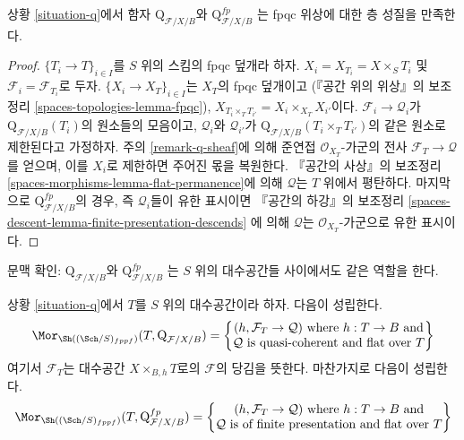 \begin{lemma}
\label{lemma-q-sheaf}
상황 \ref{situation-q}에서 함자
$\text{Q}_{\mathcal{F}/X/B}$와
$\text{Q}^{fp}_{\mathcal{F}/X/B}$
는 fpqc 위상에 대한 층 성질을 만족한다.
\end{lemma}

\begin{proof}
$\{T_i \to T\}_{i \in I}$를 $S$ 위의 스킴의 fpqc 덮개라 하자.
$X_i = X_{T_i} = X \times_S T_i$ 및 $\mathcal{F}_i = \mathcal{F}_{T_i}$로 두자.
$\{X_i \to X_T\}_{i \in I}$는 $X_T$의 fpqc 덮개이고
(『공간 위의 위상』의 보조정리 \ref{spaces-topologies-lemma-fpqc}),
$X_{T_i \times_T T_{i'}} = X_i \times_{X_T} X_{i'}$이다.
$\mathcal{F}_i \to \mathcal{Q}_i$가 $\text{Q}_{\mathcal{F}/X/B}(T_i)$의
원소들의 모음이고, $\mathcal{Q}_i$와 $\mathcal{Q}_{i'}$가
$\text{Q}_{\mathcal{F}/X/B}(T_i \times_T T_{i'})$의 같은 원소로
제한된다고 가정하자. 주의 \ref{remark-q-sheaf}에 의해 준연접
$\mathcal{O}_{X_T}$-가군의 전사 $\mathcal{F}_T \to \mathcal{Q}$를 얻으며,
이를 $X_i$로 제한하면 주어진 몫을 복원한다.
『공간의 사상』의 보조정리 \ref{spaces-morphisms-lemma-flat-permanence}에 의해
$\mathcal{Q}$는 $T$ 위에서 평탄하다. 마지막으로
$\text{Q}^{fp}_{\mathcal{F}/X/B}$의 경우, 즉 $\mathcal{Q}_i$들이
유한 표시이면 『공간의 하강』의 보조정리
\ref{spaces-descent-lemma-finite-presentation-descends}
에 의해 $\mathcal{Q}$는 $\mathcal{O}_{X_T}$-가군으로 유한 표시이다.
\end{proof}

\noindent
문맥 확인: $\text{Q}_{\mathcal{F}/X/B}$와
$\text{Q}^{fp}_{\mathcal{F}/X/B}$
는 $S$ 위의 대수공간들 사이에서도 같은 역할을 한다.

\begin{lemma}
\label{lemma-extend-q-to-spaces}
상황 \ref{situation-q}에서 $T$를 $S$ 위의 대수공간이라 하자. 다음이 성립한다.
$$
\Mor_{\Sh((\Sch/S)_{fppf})}(T,  \text{Q}_{\mathcal{F}/X/B}) =
\left\{
\begin{matrix}
(h, \mathcal{F}_T \to \mathcal{Q}) \text{ where }
h : T \to B \text{ and}\\
\mathcal{Q}\text{ is quasi-coherent and flat over }T
\end{matrix}
\right\}
$$
여기서 $\mathcal{F}_T$는 대수공간 $X \times_{B, h} T$로의
$\mathcal{F}$의 당김을 뜻한다. 마찬가지로 다음이 성립한다.
$$
\Mor_{\Sh((\Sch/S)_{fppf})}(T,  \text{Q}^{fp}_{\mathcal{F}/X/B}) =
\left\{
\begin{matrix}
(h, \mathcal{F}_T \to \mathcal{Q}) \text{ where }
h : T \to B \text{ and}\\
\mathcal{Q}\text{ is of finite presentation and flat over }T
\end{matrix}
\right\}
$$
\end{lemma}

